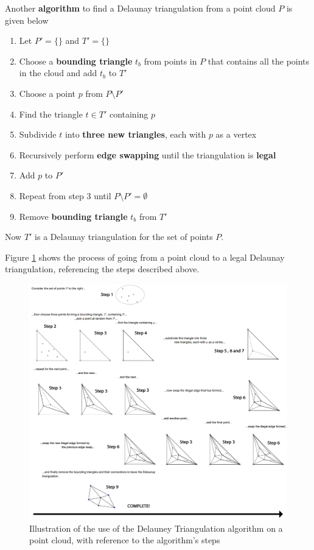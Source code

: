 \documentclass{article}
\begin{document}
Another \textbf{algorithm} to find a Delaunay triangulation from a point cloud $P$ is given below
\begin{enumerate}
	\item Let $P' = \lbrace \rbrace$ and $T' = \lbrace \rbrace$
	\item Choose a \textbf{bounding triangle} $t_b$ from points in $P$ that contains all the points in the cloud and add $t_b$ to $T'$
	\item Choose a point $p$ from $P \setminus P'$
	\item Find the triangle $t \in T'$ containing $p$
	\item Subdivide $t$ into \textbf{three new triangles}, each with $p$ as a vertex
	\item Recursively perform \textbf{edge swapping} until the triangulation is \textbf{legal}
	\item Add $p$ to $P'$
	\item Repeat from step 3 until $P \setminus P' = \emptyset$
	\item Remove \textbf{bounding triangle} $t_b$ from $T'$
\end{enumerate}
Now $T'$ is a Delaunay triangulation for the set of points $P$.

Figure \ref{fig:delaunay-triangulation-example} shows the process of going from a point cloud to a legal Delaunay triangulation, referencing the steps described above.

\begin{landscape}
	\begin{figure}[H]
		\centering
		\includegraphics[scale=0.30]{figures/delaunay-triangulation-example.png}
		\caption{Illustration of the use of the Delauney Triangulation algorithm on a point cloud, with reference to the algorithm's steps}
		\label{fig:delaunay-triangulation-example}
	\end{figure}
\end{landscape}
\end{document}
